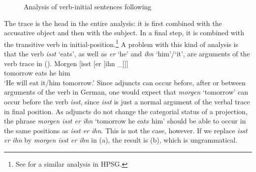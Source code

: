 \begin{figure}
\caption{\label{Abbildung-CG-isst-der-junge-den-kuchen-jacobs}Analysis of verb-initial sentences following \citet{Jacobs91a}}
\end{figure}%
The trace is the head in the entire analysis: it is first combined with the accusative object and then with the subject. In a final step,
it is combined with the transitive verb in initial-position.\footnote{%
 See  for a similar analysis in HPSG\indexhpsg.
} 
A problem with this kind of analysis is that the verb \emph{isst} `eats', as well as \emph{er} `he' and
\emph{ihn} `him'/`it', are arguments of the verb trace in ().
\ea
\gll Morgen [isst [er [ihn \_]]]\\
	 tomorrow \spacebr{}eats \spacebr{}he \spacebr{}him\\
\glt `He will eat it/him tomorrow.'
\z
\addlines[2]
Since adjuncts can occur before, after or between arguments of the verb in German, one would expect that \emph{morgen} `tomorrow' can occur before the verb
\emph{isst}, since \emph{isst} is just a normal argument of the verbal trace in final position. As adjuncts do not change the categorial status of a projection, the phrase \emph{morgen isst er ihn} `tomorrow he eats him' should be able to
occur in the same positions as \emph{isst er ihn}. This is not the case, however. If we replace
\emph{isst er ihn} by \emph{morgen isst er ihn} in (a), the result is (b), which is ungrammatical.
\eal
{}

